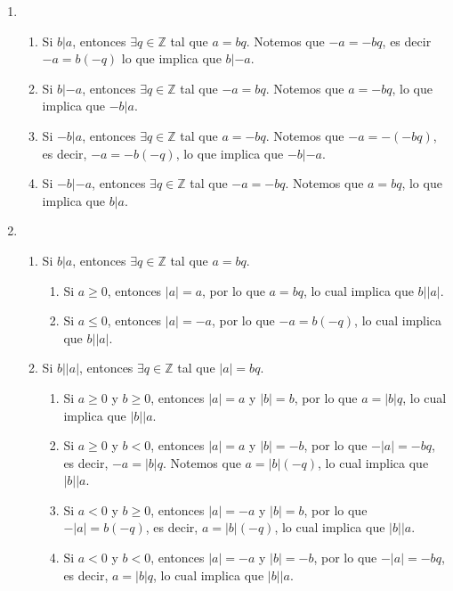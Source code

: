 \documentclass[11pt]{article}
\newcommand{\Z}{\mathbb{Z}}
\begin{document}
\begin{enumerate}[label=P\arabic*.]
    \item
      \begin{enumerate}[label=\roman*), font=\bfseries]
      \item Si $b|a$, entonces $\exists q \in \Z$ tal que $a=bq$. Notemos que   $-a=-bq$, es decir $-a=b(-q)$ lo que implica que $b|-a$.
      \item Si $b|-a$, entonces $\exists q \in \Z$ tal que $-a=bq$. Notemos   que $a=-bq$, lo que implica que $-b|a$.
      \item Si $-b|a$, entonces $\exists q \in \Z$ tal que $a=-bq$. Notemos   que $-a=-(-bq)$, es decir, $-a=-b(-q)$, lo que implica que $-b|-a$.
      \item Si $-b|-a$, entonces $\exists q \in \Z$ tal que $-a=-bq$. Notemos que $a=bq$, lo que implica que $b|a$.
      \end{enumerate}
    \item
      \begin{enumerate}[label=\roman*)] 
      \item Si $b|a$, entonces $\exists q\in \Z$ tal que $a=bq$.
        \begin{enumerate}[label=\alph*),font=\bfseries]
          \item Si $a \geq 0$, entonces $|a|=a$, por lo que $a=bq$, lo cual implica que $b \Big||a|$.
          \item Si $a \leq 0$, entonces $|a|=-a$, por lo que $-a=b(-q)$, lo cual implica que $b \Big||a|$.
        \end{enumerate}
      \item Si $b \Big||a|$, entonces $\exists q \in \Z$ tal que $|a|=bq$.
        \begin{enumerate}[label=\alph*),font=\bfseries]
          \item Si $a \geq 0$ y $b \geq 0$, entonces $|a|=a$ y $|b|=b$, por lo que $a=|b|q$, lo cual implica que $|b| \Big| a$.
          \item Si $a \geq 0$ y $b < 0$, entonces $|a|=a$ y $|b|=-b$, por lo que $-|a|=-bq$, es decir, $-a=|b|q$. Notemos que $a=|b|(-q)$, lo cual implica que $|b| \Big| a$.
          \item Si $a < 0$ y $b \geq 0$, entonces $|a|=-a$ y $|b|=b$, por lo que $-|a|=b(-q)$, es decir, $a=|b|(-q)$, lo cual implica que $|b| \Big| a$.
          \item Si $a<0$ y $b<0$, entonces $|a|=-a$ y $|b|=-b$, por lo que $-|a|=-bq$, es decir, $a=|b|q$, lo cual implica que $|b| \Big| a$.
        \end{enumerate}

\end{enumerate}
\end{enumerate}
\end{document}
